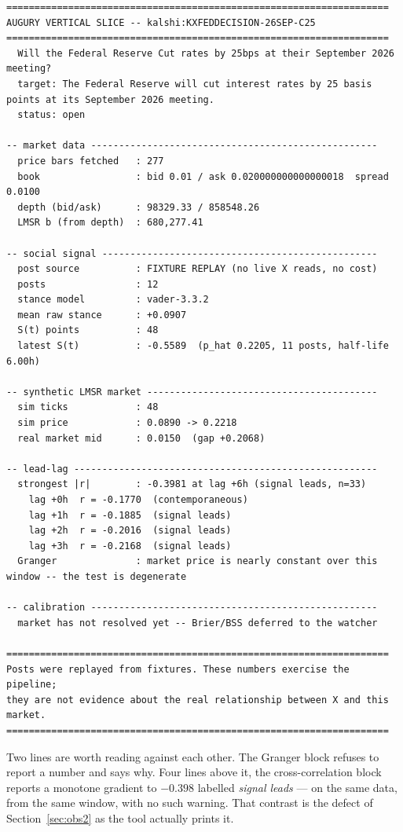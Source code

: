 \documentclass[11pt]{article}
\begin{document}
\begin{lstlisting}[basicstyle=\ttfamily\scriptsize]
====================================================================
AUGURY VERTICAL SLICE -- kalshi:KXFEDDECISION-26SEP-C25
====================================================================
  Will the Federal Reserve Cut rates by 25bps at their September 2026 meeting?
  target: The Federal Reserve will cut interest rates by 25 basis points at its September 2026 meeting.
  status: open

-- market data ---------------------------------------------------
  price bars fetched   : 277
  book                 : bid 0.01 / ask 0.020000000000000018  spread 0.0100
  depth (bid/ask)      : 98329.33 / 858548.26
  LMSR b (from depth)  : 680,277.41

-- social signal -------------------------------------------------
  post source          : FIXTURE REPLAY (no live X reads, no cost)
  posts                : 12
  stance model         : vader-3.3.2
  mean raw stance      : +0.0907
  S(t) points          : 48
  latest S(t)          : -0.5589  (p_hat 0.2205, 11 posts, half-life 6.00h)

-- synthetic LMSR market -----------------------------------------
  sim ticks            : 48
  sim price            : 0.0890 -> 0.2218
  real market mid      : 0.0150  (gap +0.2068)

-- lead-lag ------------------------------------------------------
  strongest |r|        : -0.3981 at lag +6h (signal leads, n=33)
    lag +0h  r = -0.1770  (contemporaneous)
    lag +1h  r = -0.1885  (signal leads)
    lag +2h  r = -0.2016  (signal leads)
    lag +3h  r = -0.2168  (signal leads)
  Granger              : market price is nearly constant over this window -- the test is degenerate

-- calibration ---------------------------------------------------
  market has not resolved yet -- Brier/BSS deferred to the watcher

====================================================================
Posts were replayed from fixtures. These numbers exercise the pipeline;
they are not evidence about the real relationship between X and this market.
====================================================================
\end{lstlisting}

Two lines are worth reading against each other. The Granger block refuses to
report a number and says why. Four lines above it, the cross-correlation block
reports a monotone gradient to $-0.398$ labelled \emph{signal leads} --- on the
same data, from the same window, with no such warning. That contrast is the
defect of Section~\ref{sec:obs2} as the tool actually prints it.
\end{document}
